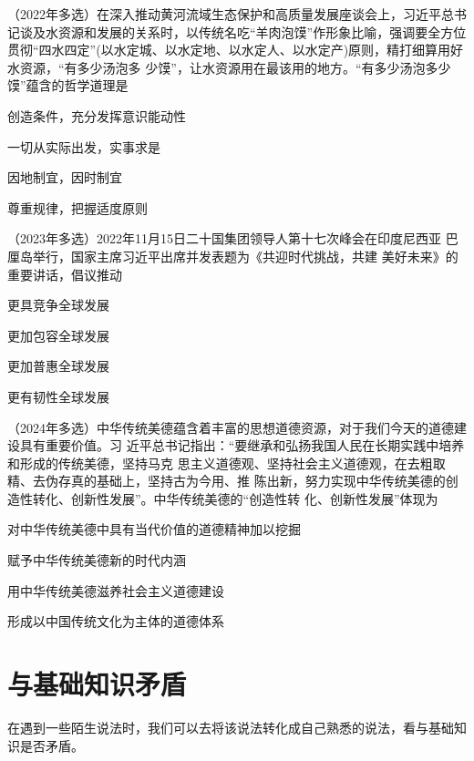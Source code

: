 \documentclass[lang=cn,blue,10pt,scheme=chinese,twocol]{zznote}
\begin{document}
\begin{example}
	（2022年多选）在深入推动黄河流域生态保护和高质量发展座谈会上，习近平总书记谈及水资源和发展的关系时，以传统名吃“羊肉泡馍”作形象比喻，强调要全方位贯彻“四水四定”(以水定城、以水定地、以水定人、以水定产)原则，精打细算用好水资源，“有多少汤泡多
	少馍”，让水资源用在最该用的地方。“有多少汤泡多少馍”蕴含的哲学道理是
	\begin{choice}
		\item 创造条件，充分发挥意识能动性
		\item 一切从实际出发，实事求是
		\item 因地制宜，因时制宜
		\item 尊重规律，把握适度原则
	\end{choice}
\end{example}


\begin{example}	（2023年多选）2022年11月15日二十国集团领导人第十七次峰会在印度尼西亚
	巴厘岛举行，国家主席习近平出席并发表题为《共迎时代挑战，共建
	美好未来》的重要讲话，倡议推动
	\begin{choice}
		\item 更具竞争全球发展
		\item 更加包容全球发展
		\item 更加普惠全球发展
		\item 更有韧性全球发展
	\end{choice}
\end{example}

\begin{example} （2024年多选）中华传统美德蕴含着丰富的思想道德资源，对于我们今天的道德建设具有重要价值。习 近平总书记指出：“要继承和弘扬我国人民在长期实践中培养和形成的传统美德，坚持马克 思主义道德观、坚持社会主义道德观，在去粗取精、去伪存真的基础上，坚持古为今用、推 陈出新，努力实现中华传统美德的创造性转化、创新性发展”。中华传统美德的“创造性转 化、创新性发展”体现为
	\begin{choice}
		\item 对中华传统美德中具有当代价值的道德精神加以挖掘
		\item 赋予中华传统美德新的时代内涵
		\item 用中华传统美德滋养社会主义道德建设
		\item 形成以中国传统文化为主体的道德体系
	\end{choice}
\end{example}

\section{与基础知识矛盾}
\begin{definition}
	在遇到一些陌生说法时，我们可以去将该说法转化成自己熟悉的说法，看与基础知识是否矛盾。
\end{definition}
\end{document}
